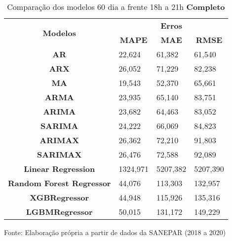 \begin{table}[H]
	\centering
	\caption{Comparação dos modelos 60 dia a frente 18h a 21h \textbf{Completo} }\label{tb:60-18cm}
	\begin{tabular}{@{}clll@{}}
		\toprule
		\multirow{2}{*}{\textbf{Modelos}} & \multicolumn{3}{c}{\textbf{Erros}}                                                                       \\ \cmidrule(l){2-4} 
		& \multicolumn{1}{c}{\textbf{MAPE}} & \multicolumn{1}{c}{\textbf{MAE}} & \multicolumn{1}{c}{\textbf{RMSE}} \\ \hline
\textbf{AR}                       & 22,624                            & 61,382                           & 61,540                            \\
\textbf{ARX}                      & 26,052                            & 71,229                           & 82,238                            \\
\textbf{MA}                       & 19,543                            & 52,370                           & 65,661                            \\
\textbf{ARMA}                     & 23,935                            & 65,140                           & 83,751                            \\
\textbf{ARIMA}                    & 23,682                            & 64,463                           & 83,052                            \\
\textbf{SARIMA}                   & 24,222                            & 66,069                           & 84,823                            \\
\textbf{ARIMAX}                   & 26,362                            & 72,210                           & 91,803                            \\
\textbf{SARIMAX}                  & 26,476                            & 72,588                           & 92,089                            \\
\textbf{Linear Regression}        & 1324,971                          & 5207,382                         & 5207,390                          \\
\textbf{Random Forest Regressor}  & 44,076                            & 113,303                          & 132,957                           \\
\textbf{XGBRegressor}             & 44,948                            & 115,926                          & 135,316                           \\
\textbf{LGBMRegressor}            & 50,015                            & 131,172                          & 149,229                           \\ \bottomrule
	\end{tabular}

Fonte: Elaboração própria a partir de dados da SANEPAR (2018 a 2020)
\end{table}